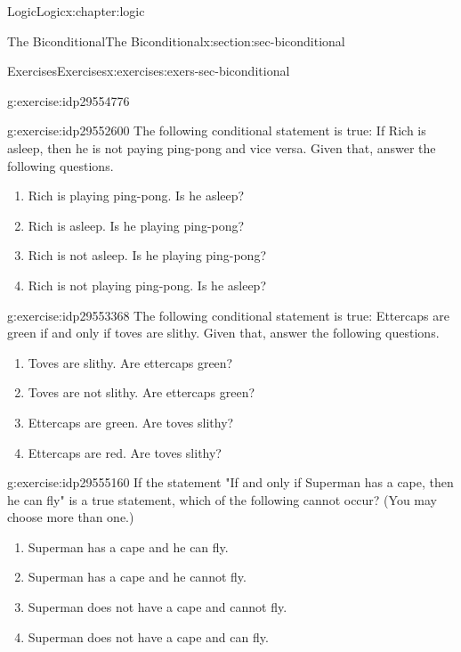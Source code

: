 \documentclass[twoside,10pt,]{book}
\numberwithin{equation}{section}
\begin{document}
\begin{chapterptx}{Logic}{}{Logic}{}{}{x:chapter:logic}
\begin{sectionptx}{The Biconditional}{}{The Biconditional}{}{}{x:section:sec-biconditional}
\begin{exercises-subsection}{Exercises}{}{Exercises}{}{}{x:exercises:exers-sec-biconditional}
\begin{divisionexercise}{33}{}{}{g:exercise:idp29554776}
\end{divisionexercise}%
\begin{divisionexercise}{34}{}{}{g:exercise:idp29552600}%
The following conditional statement is true: If Rich is asleep, then he is not paying ping-pong and vice versa.  Given that, answer the following questions. %
\begin{enumerate}[label=(\alph*)]
\item{}Rich is playing ping-pong.  Is he asleep?%
\item{}Rich is asleep.  Is he playing ping-pong?%
\item{}Rich is not asleep.  Is he playing ping-pong?%
\item{}Rich is not playing ping-pong.  Is he asleep?%
\end{enumerate}
\end{divisionexercise}%
\begin{divisionexercise}{35}{}{}{g:exercise:idp29553368}%
The following conditional statement is true: Ettercaps are green if and only if toves are slithy.  Given that, answer the following questions. %
\begin{enumerate}[label=(\alph*)]
\item{}Toves are slithy.  Are ettercaps green?%
\item{}Toves are not slithy.  Are ettercaps green?%
\item{}Ettercaps are green.  Are toves slithy?%
\item{}Ettercaps are red.  Are toves slithy?%
\end{enumerate}
\end{divisionexercise}%
\begin{divisionexercise}{36}{}{}{g:exercise:idp29555160}%
If the statement "If and only if Superman has a cape, then he can fly" is a true statement, which of the following cannot occur?  (You may choose more than one.) %
\begin{enumerate}[label=(\alph*)]
\item{}Superman has a cape and he can fly.%
\item{}Superman has a cape and he cannot fly.%
\item{}Superman does not have a cape and cannot fly.%
\item{}Superman does not have a cape and can fly.%
\end{enumerate}
\end{divisionexercise}%
\end{exercises-subsection}
%
%
\typeout{************************************************}

\end{sectionptx}
\end{chapterptx}
\end{document}
